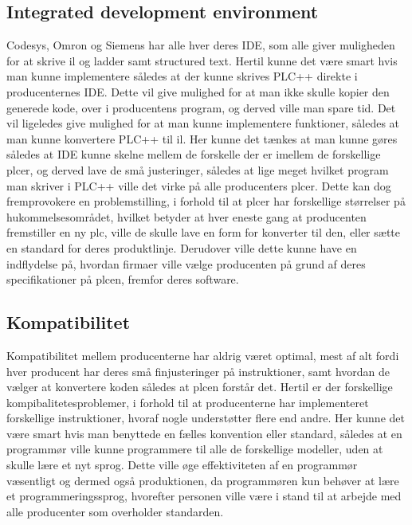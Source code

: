 \subsection*{Integrated development environment}
Codesys, Omron og Siemens har alle hver deres IDE, som alle giver muligheden for at skrive \gls{il} og ladder samt structured text.
Hertil kunne det være smart hvis man kunne implementere således at der kunne skrives PLC++ direkte i producenternes IDE. Dette vil give mulighed for at man ikke skulle kopier den generede kode, over i producentens program, og derved ville man spare tid.
Det vil ligeledes give mulighed for at man kunne implementere funktioner, således at man kunne konvertere PLC++ til \gls{il}.
Her kunne det tænkes at man kunne gøres således at IDE kunne skelne mellem de forskelle der er imellem de forskellige \gls{plc}er, og derved lave de små justeringer, således at lige meget hvilket program man skriver i PLC++ ville det virke på alle producenters \gls{plc}er.
Dette kan dog fremprovokere en problemstilling, i forhold til at \gls{plc}er har forskellige størrelser på hukommelsesområdet, hvilket betyder at hver eneste gang at producenten fremstiller en ny \gls{plc}, ville de skulle lave en form for konverter til den, eller sætte en standard for deres produktlinje.
Derudover ville dette kunne have en indflydelse på, hvordan firmaer ville vælge producenten på grund af deres specifikationer på \gls{plc}en, fremfor deres software.

\subsection*{Kompatibilitet}
Kompatibilitet mellem producenterne har aldrig været optimal, mest af alt fordi hver producent har deres små finjusteringer på instruktioner, samt hvordan de vælger at konvertere koden således at \gls{plc}en forstår det.
Hertil er der forskellige kompibalitetesproblemer, i forhold til at producenterne har implementeret forskellige instruktioner, hvoraf nogle understøtter flere end andre.
Her kunne det være smart hvis man benyttede en fælles konvention eller standard, således at en programmør ville kunne programmere til alle de forskellige modeller, uden at skulle lære et nyt sprog.
Dette ville øge effektiviteten af en programmør væsentligt og dermed også produktionen, da programmøren kun behøver at lære et programmeringssprog, hvorefter personen ville være i stand til at arbejde med alle producenter som overholder standarden.






